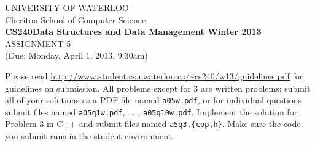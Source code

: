 \documentclass[11pt]{article}
\begin{document}
%
%
\begin{center}
UNIVERSITY OF WATERLOO\\
Cheriton School of Computer Science\\[\baselineskip]
{\bf CS240\hfill Data Structures and Data Management \hfill
Winter 2013}\\[\baselineskip]
{\sc \large ASSIGNMENT 5}\\
(Due: Monday, April 1, 2013, 9:30am)\\[2\baselineskip]
\end{center}
%
%

\noindent


Please read \url{http://www.student.cs.uwaterloo.ca/~cs240/w13/guidelines.pdf} for guidelines on submission. 
All problems except for 3 are written problems; submit all of your solutions as a PDF file named {\tt a05w.pdf}, or for individual questions submit files named {\tt a05q1w.pdf}, ... , {\tt a05q10w.pdf}. 
Implement the solution for Problem 3 in C++ and submit files named {\tt a5q3.\{cpp,h\}}. 
Make sure the code you submit runs in the student environment.
\noindent
\end{document}
